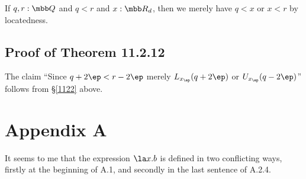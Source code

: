 \documentclass[12pt]{article}
\begin{document}
If $q,r:\mbb Q$ and $q<r$ and $x:\mbb R_d$, then we merely have $q<x$ or $x<r$ by locatedness.

\subsection{Proof of Theorem 11.2.12}

The claim ``Since $q+2\ep<r-2\ep$ merely $L_{x_\ep}(q+2\ep)$ or $U_{x_\ep}(q-2\ep)$'' follows from \S\ref{1122} above.


\section{Appendix A}

It seems to me that the expression $\la x.b$ is defined in two conflicting ways, firstly at the beginning of A.1, and secondly in the last sentence of A.2.4. 
\end{document}
